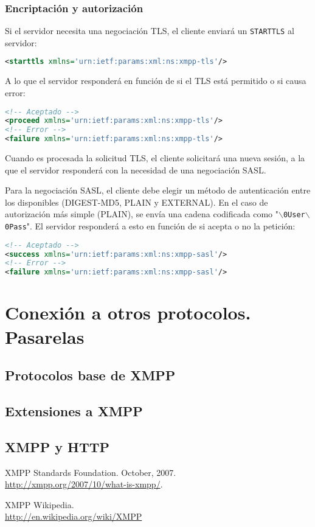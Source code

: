 \documentclass[a4paper, 11pt]{article} %
\begin{document}
  \subsubsection{Encriptación y autorización}
    Si el servidor necesita una negociación TLS, el cliente enviará un \texttt{STARTTLS} al servidor:
    \begin{lstlisting}[language=XML]
<starttls xmlns='urn:ietf:params:xml:ns:xmpp-tls'/>    
    \end{lstlisting}
    A lo que el servidor responderá en función de si el TLS está permitido o si causa error:
    \begin{lstlisting}[language=XML]
<!-- Aceptado -->
<proceed xmlns='urn:ietf:params:xml:ns:xmpp-tls'/> 
<!-- Error -->
<failure xmlns='urn:ietf:params:xml:ns:xmpp-tls'/> 
    \end{lstlisting}
    Cuando es procesada la solicitud TLS, el cliente solicitará una nueva sesión, a la que el servidor
    responderá con la necesidad de una negociación SASL.

    Para la negociación SASL, el cliente debe elegir un método de autenticación entre los disponibles
    (DIGEST-MD5, PLAIN y EXTERNAL). En el caso de autorización más simple (PLAIN), se envía una cadena
    codificada como "\texttt{$\backslash$0User$\backslash$0Pass}". El servidor responderá a esto en 
    función de si acepta o no la petición:
    \begin{lstlisting}[language=XML]
<!-- Aceptado -->
<success xmlns='urn:ietf:params:xml:ns:xmpp-sasl'/>
<!-- Error -->
<failure xmlns='urn:ietf:params:xml:ns:xmpp-sasl'/>
    \end{lstlisting}

  
\section{Conexión a otros protocolos. Pasarelas}
  \subsection{Protocolos base de XMPP}
  \subsection{Extensiones a XMPP}
  \subsection{XMPP y HTTP}
  
  

  
\vfill
\begin{thebibliography}{9}

  XMPP Standards Foundation. October, 2007.\\
  \url{http://xmpp.org/2007/10/what-is-xmpp/}.
  
  XMPP Wikipedia.\\
  \url{http://en.wikipedia.org/wiki/XMPP}
\end{thebibliography}  
  
\end{document}
